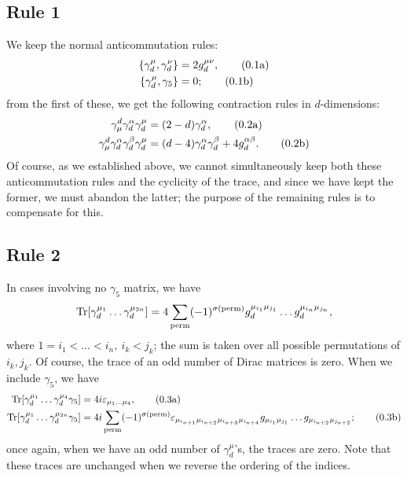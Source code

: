 \documentclass[12pt]{article}
\numberwithin{equation}{section}
\numberwithin{figure}{section}
\numberwithin{table}{section}
\newcommand{\numberthisa}{\addtocounter{equation}{1}\tag{\theequation a}}
\newcommand{\numberthisb}{\addtocounter{equation}{0}\tag{\theequation b}}
\renewcommand{\theequation}{\arabic{section}.\arabic{equation}}
\begin{document}
        \subsection{Rule 1}
        
        We keep the normal anticommutation rules: 
	\begin{align*}
	  \{\gamma_d^\mu,\gamma_d^\nu\} & =2g_d^{\mu\nu}, \numberthisa\\
          \{\gamma_d^\mu,\gamma_5\} & =0; \numberthisb
	\end{align*}
        from the first of these, we get the following contraction rules in \(d\)-dimensions: 
	\begin{align*}
	  \gamma_\mu^d\gamma_d^\alpha\gamma_d^\mu & =(2-d)\gamma_d^\alpha, \numberthisa\\
          \gamma_\mu^d\gamma_d^\alpha\gamma_d^\beta\gamma_d^\mu & =(d-4)\gamma_d^\alpha\gamma_d^\beta+4g_d^{\alpha\beta}. \numberthisb
	\end{align*}
        Of course, as we established above, we cannot simultaneously keep both these anticommutation rules and the cyclicity of the trace, and since we have kept the former, we must abandon the latter; the purpose of the remaining rules is to compensate for this.

        \subsection{Rule 2}

        In cases involving no \(\gamma_5\) matrix, we have 
	\begin{equation}
	\Tr[\gamma_d^{\mu_1}\dots\gamma_d^{\mu_{2n}}]=4\sum_\mathrm{perm}(-1)^{\sigma(\mathrm{perm})}g_d^{\mu_{i_1}\mu_{j_1}}\dots g_d^{\mu_{i_n}\mu_{j_n}},
	\end{equation}
        where \(1=i_1<\dots<i_n, \ i_k<j_k\); the sum is taken over all possible permutations of \(i_k,j_k\). Of course, the trace of an odd number of Dirac matrices is zero. When we include \(\gamma_5\), we have 
	\begin{align*}
	  \Tr[\gamma_d^{\mu_1}\dots\gamma_d^{\mu_4}\gamma_5] & =4i\varepsilon_{\mu_1\dots\mu_4}, \numberthisa\\
          \Tr[\gamma_d^{\mu_1}\dots\gamma_d^{\mu_{2n}}\gamma_5] & =4i\sum_\mathrm{perm}(-1)^{\sigma(\mathrm{perm})}\varepsilon_{\mu_{i_{n+1}}\mu_{i_{n+2}}\mu_{i_{n+3}}\mu_{i_{n+4}}}g_{\mu_{i_1}\mu_{j_1}}\dots g_{\mu_{i_{n+2}}\mu_{j_{n+2}}}; \numberthisb
	\end{align*}
        once again, when we have an odd number of \(\gamma_d^{\mu}\)'s, the traces are zero. Note that these traces are unchanged when we reverse the ordering of the indices.
\end{document}
